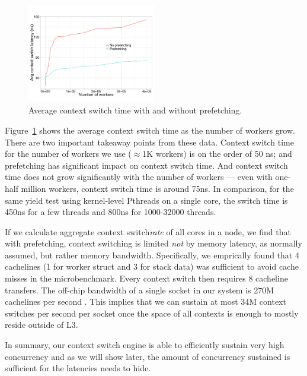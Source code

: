 \begin{figure}[ht]
    \begin{center}
      \includegraphics[width=0.5\textwidth]{figs/context_switch_time.pdf}
    \end{center}
    \caption{Average context switch time with and without prefetching.}
    \label{fig:context-switch-exp}
\end{figure}

Figure~\ref{fig:context-switch-exp} shows the average context switch time as
the number of workers grow. There are two important takeaway points from these
data. Context switch time for the number of workers we use ($\approx$1K workers) is
on the order of 50 ns; and prefetching has significant impact on context
switch time. And context switch time does not grow significantly with the
number of workers --- even with one-half million workers, context
switch time is around 75ns. In comparison, for the same yield test using kernel-level
Pthreads on a single core, the switch time is 450ns for a few threads and 800ns for
1000-32000 threads.

If we calculate aggregate context switch\emph{rate} of all
cores in a node, we find that with prefetching, \Grappa context
switching is
limited \emph{not} by memory latency, as normally assumed, but rather memory bandwidth.
Specifically, we emprically found that 4 cachelines (1 for worker
struct and 3 for stack data) was sufficient to avoid cache misses in
the microbenchmark. Every context switch then requires 8 cacheline transfers. The off-chip
bandwidth of a single socket in our system is 270M cachelines per
second \cite{porterfield:bw,Nelson:hotpar11-real}. This implies that
we can sustain at most 34M context switches per second per socket once
the space of all contexts is enough to mostly reside outside of L3.

In summary, our context switch engine is able to efficiently sustain very high
concurrency and as we will show later, the amount of concurrency sustained is
sufficient for the latencies \Grappa needs to hide.

